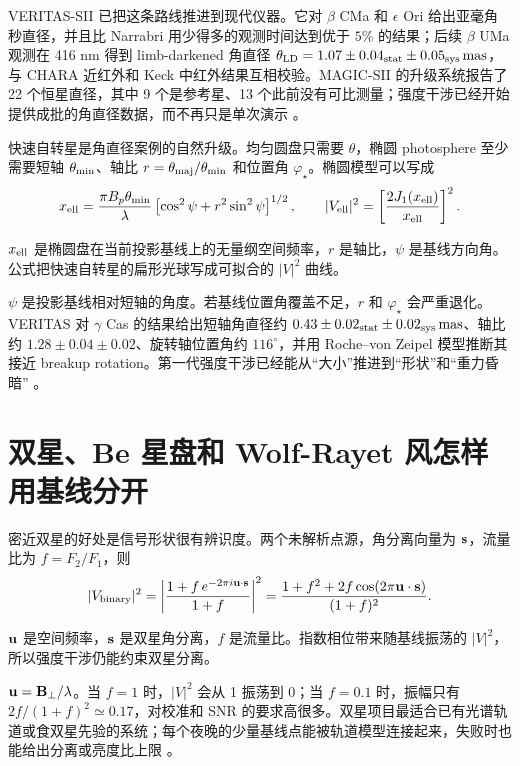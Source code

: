 VERITAS-SII 已把这条路线推进到现代仪器。它对 \(\beta\) CMa 和 \(\epsilon\) Ori 给出亚毫角秒直径，并且比 Narrabri 用少得多的观测时间达到优于 \(5\%\) 的结果；后续 \(\beta\) UMa 观测在 416 nm 得到 limb-darkened 角直径 \(\theta_{\rm LD}=1.07\pm0.04_{\rm stat}\pm0.05_{\rm sys}\,{\rm mas}\)，与 CHARA 近红外和 Keck 中红外结果互相校验。MAGIC-SII 的升级系统报告了 22 个恒星直径，其中 9 个是参考星、13 个此前没有可比测量；强度干涉已经开始提供成批的角直径数据，而不再只是单次演示 \citep{2020NatAs...4.1164A,2024ApJ...966...28A,2024MNRAS.529.4387A}。

快速自转星是角直径案例的自然升级。均匀圆盘只需要 \(\theta\)，椭圆 photosphere 至少需要短轴 \(\theta_{\rm min}\)、轴比 \(r=\theta_{\rm maj}/\theta_{\rm min}\) 和位置角 \(\varphi_\star\)。椭圆模型可以写成
\begin{equation}
  x_{\rm ell}
  =
  \frac{\pi B_p\theta_{\rm min}}{\lambda}
  \left[
  \cos^2\psi
  +
  r^2\sin^2\psi
  \right]^{1/2},
  \qquad
  |V_{\rm ell}|^2
  =
  \left[\frac{2J_1(x_{\rm ell})}{x_{\rm ell}}\right]^2 .
  \label{eq:ch19-elliptical-visibility}
\end{equation}
\begin{formulaexplain}[公式 (19.3) 解读]
\(x_{\rm ell}\) 是椭圆盘在当前投影基线上的无量纲空间频率，\(r\) 是轴比，\(\psi\) 是基线方向角。公式把快速自转星的扁形光球写成可拟合的 \(|V|^2\) 曲线。
\end{formulaexplain}
\(\psi\) 是投影基线相对短轴的角度。若基线位置角覆盖不足，\(r\) 和 \(\varphi_\star\) 会严重退化。VERITAS 对 \(\gamma\) Cas 的结果给出短轴角直径约 \(0.43\pm0.02_{\rm stat}\pm0.02_{\rm sys}\,{\rm mas}\)、轴比约 \(1.28\pm0.04\pm0.02\)、旋转轴位置角约 \(116^\circ\)，并用 Roche--von Zeipel 模型推断其接近 breakup rotation。第一代强度干涉已经能从“大小”推进到“形状”和“重力昏暗” \citep{2025ApJ...995..191A}。

\section{双星、Be 星盘和 Wolf-Rayet 风怎样用基线分开}

密近双星的好处是信号形状很有辨识度。两个未解析点源，角分离向量为 \({\bf s}\)，流量比为 \(f=F_2/F_1\)，则
\begin{equation}
  |V_{\rm binary}|^2
  =
  \left|
  \frac{1+f\,e^{-2\pi i{\bf u}\cdot{\bf s}}}
  {1+f}
  \right|^2
  =
  \frac{1+f^2+2f\cos(2\pi{\bf u}\cdot{\bf s})}
  {(1+f)^2}.
  \label{eq:ch19-binary-visibility}
\end{equation}
\begin{formulaexplain}[公式 (19.4) 解读]
\({\bf u}\) 是空间频率，\({\bf s}\) 是双星角分离，\(f\) 是流量比。指数相位带来随基线振荡的 \(|V|^2\)，所以强度干涉仍能约束双星分离。
\end{formulaexplain}
\({\bf u}={\bf B}_\perp/\lambda\)。当 \(f=1\) 时，\(|V|^2\) 会从 1 振荡到 0；当 \(f=0.1\) 时，振幅只有 \(2f/(1+f)^2\simeq0.17\)，对校准和 SNR 的要求高很多。双星项目最适合已有光谱轨道或食双星先验的系统；每个夜晚的少量基线点能被轨道模型连接起来，失败时也能给出分离或亮度比上限 \citep{1974MNRAS.167..121H,2012MNRAS.419..172N,2014MNRAS.437..798M,2022MNRAS.512.1722K}。

